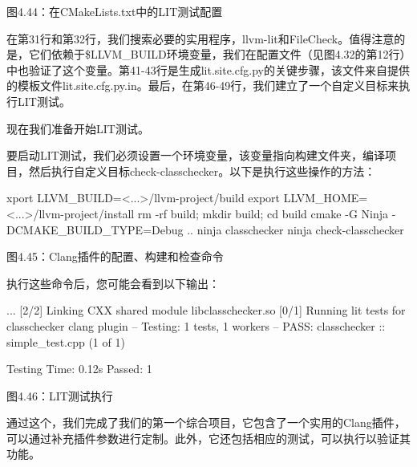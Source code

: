 \begin{center}
图4.44：在CMakeLists.txt中的LIT测试配置
\end{center}

在第31行和第32行，我们搜索必要的实用程序，llvm-lit和FileCheck。值得注意的是，它们依赖于\$LLVM\_BUILD环境变量，我们在配置文件（见图4.32的第12行）中也验证了这个变量。第41-43行是生成lit.site.cfg.py的关键步骤，该文件来自提供的模板文件lit.site.cfg.py.in。最后，在第46-49行，我们建立了一个自定义目标来执行LIT测试。

现在我们准备开始LIT测试。


要启动LIT测试，我们必须设置一个环境变量，该变量指向构建文件夹，编译项目，然后执行自定义目标check-classchecker。以下是执行这些操作的方法：

\begin{shell}
xport LLVM_BUILD=<...>/llvm-project/build
export LLVM_HOME=<...>/llvm-project/install
rm -rf build; mkdir build; cd build
cmake -G Ninja -DCMAKE_BUILD_TYPE=Debug ..
ninja classchecker
ninja check-classchecker
\end{shell}

\begin{center}
图4.45：Clang插件的配置、构建和检查命令
\end{center}

执行这些命令后，您可能会看到以下输出：

\begin{shell}
...
[2/2] Linking CXX shared module libclasschecker.so
[0/1] Running lit tests for classchecker clang plugin
-- Testing: 1 tests, 1 workers --
PASS: classchecker :: simple_test.cpp (1 of 1)

Testing Time: 0.12s
Passed: 1
\end{shell}

\begin{center}
图4.46：LIT测试执行
\end{center}

通过这个，我们完成了我们的第一个综合项目，它包含了一个实用的Clang插件，可以通过补充插件参数进行定制。此外，它还包括相应的测试，可以执行以验证其功能。








